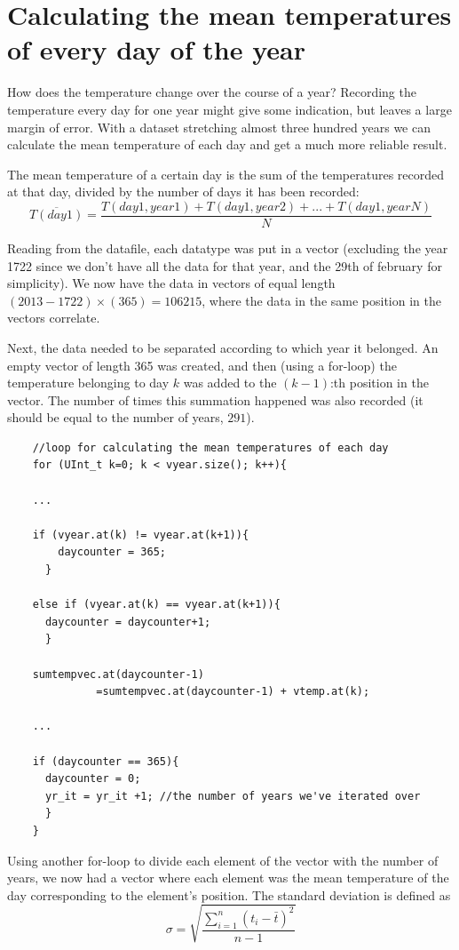 \documentclass[a4paper,12pt,twoside]{article}
\begin{document}
 \section{Calculating the mean temperatures of every day of the year}
 \label{sec:3.2}
 How does the temperature change over the course of a year? Recording the temperature
 every day for one year might give some indication, but leaves a large margin of error.
 With a dataset stretching almost three hundred years we can calculate the mean
 temperature of each day and get a much more reliable result.
 
 The mean temperature of a certain day is the sum of the temperatures recorded at
 that day, divided by the number of days it has been recorded:
 \begin{equation}
  \label{eq:MeanTempPerDay}
  \overline{T(day 1)} = \frac{T(day 1, year 1)+T(day 1, year 2)+...+T(day 1, year N)}{N}
 \end{equation} 
  
 
 Reading from the datafile, each datatype was put in a vector (excluding the year
 1722 since we don't have all the data for that year, and the 29th of february for
 simplicity). We now have the data in vectors of equal length $(2013-1722)\times(365)=106215$,
 where the data in the same position in the vectors correlate.
 
 Next, the data needed to be separated according to which year it belonged. An empty
 vector of length 365 was created, and then (using a for-loop) the temperature belonging
 to day $k$ was added to the $(k-1)$:th position in the vector. The number of times this
 summation happened was also recorded (it should be equal to the number of years, $291$).
 
 \begin{verbatim}
  	//loop for calculating the mean temperatures of each day
	for (UInt_t k=0; k < vyear.size(); k++){
	
	...
	
	if (vyear.at(k) != vyear.at(k+1)){
		daycounter = 365;
	  }

	else if (vyear.at(k) == vyear.at(k+1)){
	  daycounter = daycounter+1;
	  }
	
	sumtempvec.at(daycounter-1)
	          =sumtempvec.at(daycounter-1) + vtemp.at(k);
	
	...
	
	if (daycounter == 365){
	  daycounter = 0;
	  yr_it = yr_it +1; //the number of years we've iterated over
	  }
	}
 \end{verbatim}
 Using another for-loop to divide each element of the vector with the number of years,
 we now had a vector where each element was the mean temperature of the day
 corresponding to the element's position.
 \newline
 The standard deviation is defined as 
  \begin{equation}
 \label{eq:StdDev}
 \sigma = \sqrt{\frac{\sum\limits_{i=1}^{n} (t_{i}-\bar{t})^2}{n-1}}
 \end{equation}
 
\end{document}
